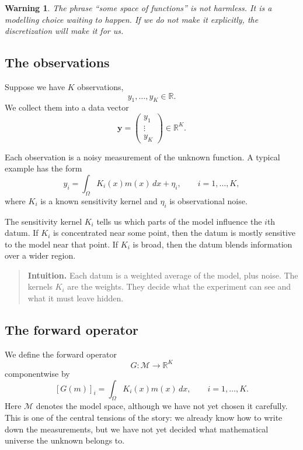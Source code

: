 \documentclass[11pt,a4paper]{book}
\newtheorem{warning}[definition]{Warning}
\newenvironment{intuition}
  {\begin{quote}\textbf{Intuition.}}
  {\end{quote}}
\newcommand{\M}{\mathcal{M}}      %
\newcommand{\G}{G}
\begin{document}
\begin{warning}
The phrase ``some space of functions'' is not harmless. It is a modelling
choice waiting to happen. If we do not make it explicitly, the discretization
will make it for us.
\end{warning}

\subsection{The observations}

Suppose we have $K$ observations,
\[
    y_1,\ldots,y_K \in \mathbb{R}.
\]
We collect them into a data vector
\[
    \bm{y}
    =
    \begin{pmatrix}
        y_1\\
        \vdots\\
        y_K
    \end{pmatrix}
    \in \mathbb{R}^K.
\]

Each observation is a noisy measurement of the unknown function. A typical
example has the form
\[
    y_i
    =
    \int_{\Omega} K_i(x)m(x)\,dx
    +
    \eta_i,
    \qquad
    i=1,\ldots,K,
\]
where $K_i$ is a known sensitivity kernel and $\eta_i$ is observational noise.

The sensitivity kernel $K_i$ tells us which parts of the model influence the
$i$th datum. If $K_i$ is concentrated near some point, then the datum is mostly
sensitive to the model near that point. If $K_i$ is broad, then the datum blends
information over a wider region.

\begin{intuition}
Each datum is a weighted average of the model, plus noise. The kernels
$K_i$ are the weights. They decide what the experiment can see and what it
must leave hidden.
\end{intuition}

\subsection{The forward operator}

We define the forward operator
\[
    \G : \M \to \mathbb{R}^K
\]
componentwise by
\[
    [\G(m)]_i
    =
    \int_{\Omega} K_i(x)m(x)\,dx,
    \qquad
    i=1,\ldots,K.
\]
Here $\M$ denotes the model space, although we have not yet chosen it
carefully. This is one of the central tensions of the story: we already know
how to write down the measurements, but we have not yet decided what
mathematical universe the unknown belongs to.
\end{document}
